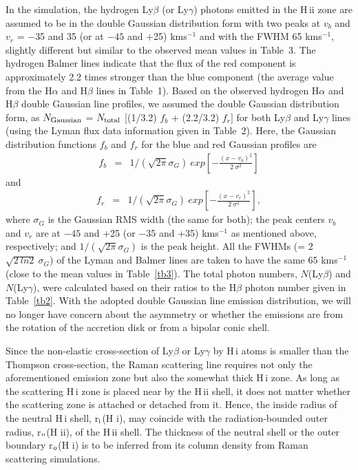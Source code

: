 \documentclass[a4paper,fleqn,usenatbib,useAMS]{mnras}
\def\ha{H{$\alpha$}}
\def\hb{H{$\beta$}}
\def\hi{H\,{\sc i}}
\def\hii{H\,{\sc ii}}
\def\kms{km\hspace{1pt}s$^{-1}$}
\begin{document}
{In the simulation, the hydrogen Ly$\beta$ (or Ly$\gamma$) photons emitted in the {\hii} zone are assumed to be in the double Gaussian distribution form with two peaks at $v_{b}$ and $v_{r}$ = $-$35 and 35 (or at $-45$ and +25) {\kms} and with the FWHM 65 {\kms}, slightly different but similar to the observed mean values in Table~3. The hydrogen Balmer lines indicate that the flux of the red component is approximately 2.2 times stronger than the blue component (the average value from the {\ha} and {\hb} lines in Table~1). Based on the observed hydrogen {\ha} and {\hb} double Gaussian line profiles, we assumed the double Gaussian distribution form, as $N_{\rm Gaussian} $ = $N_{\rm total}$ $[$(1/3.2) $f_b$ +  (2.2/3.2) $f_r$$]$ for both Ly$\beta$ and Ly$\gamma$ lines (using the Lyman flux data information given in Table~2).
Here, the Gaussian distribution functions $f_b$ and $f_r$ for the blue and red Gaussian profiles are
\begin{eqnarray*}
f_{b} & = & 1/(\sqrt{2 \pi} \sigma_G)~exp[-\frac{(x - v_{b})^2}{2~\sigma^2}]
\end{eqnarray*}
and
\begin{eqnarray*}
f_{r} & = & 1/(\sqrt{2 \pi} \sigma_G)~exp[-\frac{(x - v_{r})^2}{2~\sigma^2}],
\end{eqnarray*}
where $\sigma_G$ is the Gaussian RMS width  (the same for both); the peak centers $v_{b}$ and $v_{r}$ are at $-45$ and +25 (or $-$35 and +35) {\kms} as mentioned above, respectively; and  $1/(\sqrt{2 \pi}\sigma_G)$ is the peak height. All the FWHMs (= 2$\sqrt{2~ln 2}~\sigma_G$) of the Lyman and  Balmer lines are taken to have the same 65 {\kms} (close to the mean values in Table~\ref{tb3}). The total photon numbers, $N$(Ly$\beta$) and $N$(Ly$\gamma$), were calculated based on their ratios to the {\hb} photon number given in Table~\ref{tb2}. With the adopted double Gaussian line emission distribution, we will no longer have concern about the asymmetry or whether the emissions are from the rotation of the accretion disk or from a bipolar conic shell.

Since the non-elastic cross-section of Ly$\beta$ or Ly$\gamma$ by {\hi} atoms is smaller than the Thompson cross-section, the Raman scattering line requires not only the aforementioned emission zone but also the somewhat thick {\hi}  zone.
As long as the scattering {\hi} zone is placed near by the {\hii} shell, it does not matter whether the scattering zone is attached or detached from it. Hence, the  inside radius of the neutral {\hi} shell, r$_{\rm i}$(H {\sc i}), may coincide with the radiation-bounded outer radius, r$_{\rm o}$(H {\sc ii}), of the {\hii} shell. The thickness of the neutral shell or the outer boundary r$_{\rm o}$(H {\sc i}) is to be inferred from its column density from Raman scattering simulations.

}
\end{document}
